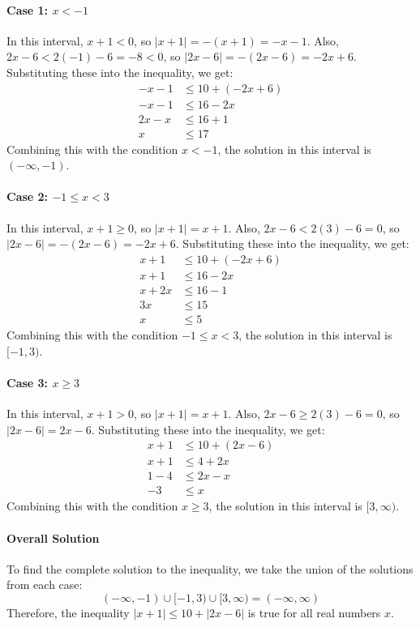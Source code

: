 \paragraph{Case 1: $x < -1$}
In this interval, $x + 1 < 0$, so $|x + 1| = -(x + 1) = -x - 1$. Also, $2x - 6 < 2(-1) - 6 = -8 < 0$, so $|2x - 6| = -(2x - 6) = -2x + 6$. Substituting these into the inequality, we get:
\begin{align*}
-x - 1 &\leq 10 + (-2x + 6) \\
-x - 1 &\leq 16 - 2x \\
2x - x &\leq 16 + 1 \\
x &\leq 17
\end{align*}
Combining this with the condition $x < -1$, the solution in this interval is $(-\infty, -1)$.

\paragraph{Case 2: $-1 \leq x < 3$}
In this interval, $x + 1 \geq 0$, so $|x + 1| = x + 1$. Also, $2x - 6 < 2(3) - 6 = 0$, so $|2x - 6| = -(2x - 6) = -2x + 6$. Substituting these into the inequality, we get:
\begin{align*}
x + 1 &\leq 10 + (-2x + 6) \\
x + 1 &\leq 16 - 2x \\
x + 2x &\leq 16 - 1 \\
3x &\leq 15 \\
x &\leq 5
\end{align*}
Combining this with the condition $-1 \leq x < 3$, the solution in this interval is $[-1, 3)$.

\paragraph{Case 3: $x \geq 3$}
In this interval, $x + 1 > 0$, so $|x + 1| = x + 1$. Also, $2x - 6 \geq 2(3) - 6 = 0$, so $|2x - 6| = 2x - 6$. Substituting these into the inequality, we get:
\begin{align*}
x + 1 &\leq 10 + (2x - 6) \\
x + 1 &\leq 4 + 2x \\
1 - 4 &\leq 2x - x \\
-3 &\leq x
\end{align*}
Combining this with the condition $x \geq 3$, the solution in this interval is $[3, \infty)$.

\paragraph{Overall Solution}
To find the complete solution to the inequality, we take the union of the solutions from each case:
\[(-\infty, -1) \cup [-1, 3) \cup [3, \infty) = (-\infty, \infty)\]
Therefore, the inequality $|x + 1| \leq 10 + |2x - 6|$ is true for all real numbers $x$.
\newpage